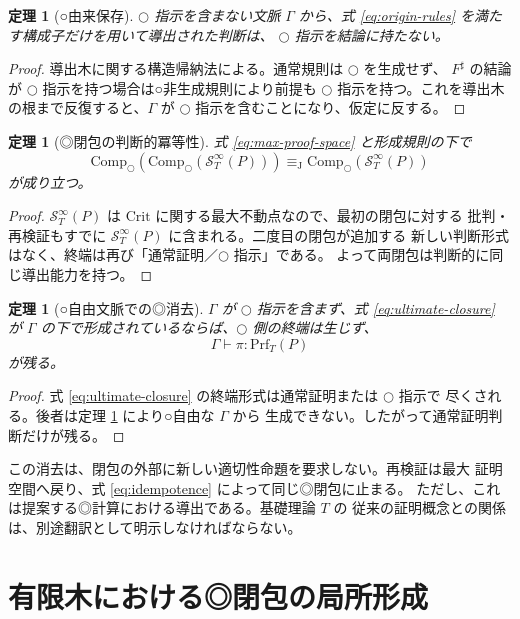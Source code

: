 \documentclass[a4paper,11pt]{ltjsarticle}
\theoremstyle{definition}
\theoremstyle{plain}
\newtheorem{theorem}[definition]{定理}
\newcommand{\dfix}{\mathord{\text{○}}}
\newcommand{\Prf}{\mathrm{Prf}}
\newcommand{\Comp}{\mathrm{Comp}_{\dfix}}
\newcommand{\Crit}{\mathrm{Crit}}
\newcommand{\Sinf}{\mathcal{S}^{\infty}}
\newcommand{\JTeq}{\equiv_{\mathrm{J}}}
\newcommand{\1}{\mathbf{1}}
\begin{document}
\begin{theorem}[○由来保存]\label{thm:origin}
$\dfix$ 指示を含まない文脈 $\Gamma$ から、式
\eqref{eq:origin-rules} を満たす構成子だけを用いて導出された判断は、
$\dfix$ 指示を結論に持たない。
\end{theorem}

\begin{proof}
導出木に関する構造帰納法による。通常規則は $\dfix$ を生成せず、
$F^\sharp$ の結論が $\dfix$ 指示を持つ場合は○非生成規則により前提も
$\dfix$ 指示を持つ。これを導出木の根まで反復すると、$\Gamma$ が
$\dfix$ 指示を含むことになり、仮定に反する。
\end{proof}

\begin{theorem}[◎閉包の判断的冪等性]\label{thm:idempotence}
式 \eqref{eq:max-proof-space} と形成規則の下で
\begin{equation}\label{eq:idempotence}
 \Comp\!\left(\Comp(\Sinf_T(P))\right)
 \JTeq
 \Comp(\Sinf_T(P))
\end{equation}
が成り立つ。
\end{theorem}

\begin{proof}
$\Sinf_T(P)$ は $\Crit$ に関する最大不動点なので、最初の閉包に対する
批判・再検証もすでに $\Sinf_T(P)$ に含まれる。二度目の閉包が追加する
新しい判断形式はなく、終端は再び「通常証明／$\dfix$ 指示」である。
よって両閉包は判断的に同じ導出能力を持つ。
\end{proof}

\begin{theorem}[○自由文脈での◎消去]\label{thm:ultimate-elim}
$\Gamma$ が $\dfix$ 指示を含まず、式 \eqref{eq:ultimate-closure} が
$\Gamma$ の下で形成されているならば、$\dfix$ 側の終端は生じず、
\[
 \Gamma\vdash\pi:\Prf_T(P)
\]
が残る。
\end{theorem}

\begin{proof}
式 \eqref{eq:ultimate-closure} の終端形式は通常証明または $\dfix$ 指示で
尽くされる。後者は定理 \ref{thm:origin} により○自由な $\Gamma$ から
生成できない。したがって通常証明判断だけが残る。
\end{proof}

この消去は、閉包の外部に新しい適切性命題を要求しない。再検証は最大
証明空間へ戻り、式 \eqref{eq:idempotence} によって同じ◎閉包に止まる。
ただし、これは提案する◎計算における導出である。基礎理論 $T$ の
従来の証明概念との関係は、別途翻訳として明示しなければならない。

\section{有限木における◎閉包の局所形成}
\end{document}
